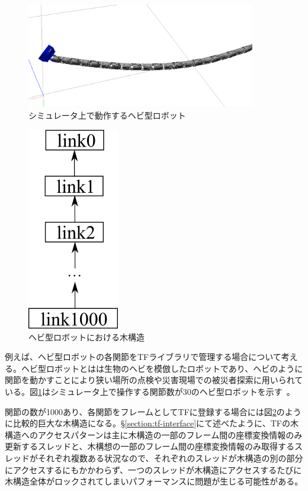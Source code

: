 \documentclass[a4paper]{jreport}	%
\begin{document}
\begin{figure}[h] 
\centering
\includegraphics[width=10cm]{snake-sim}	
\caption{シミュレータ上で動作するヘビ型ロボット}
\label{fig:snake-sim}
\end{figure}

\begin{figure}[h] 
\centering
\includegraphics[width=4cm]{snake}	
\caption{ヘビ型ロボットにおける木構造}
\label{fig:snake}
\end{figure}


例えば、ヘビ型ロボットの各関節をTFライブラリで管理する場合について考える。ヘビ型ロボットとはは生物のヘビを模倣したロボットであり、ヘビのように関節を動かすことにより狭い場所の点検や災害現場での被災者探索に用いられている。図\ref{fig:snake-sim}はシミュレータ上で操作する関節数が30のヘビ型ロボットを示す~\cite{snake-sim}。

関節の数が1000あり、各関節をフレームとしてTFに登録する場合には図\ref{fig:snake}のように比較的巨大な木構造になる。§\ref{section:tf-interface}にて述べたように、TFの木構造へのアクセスパターンは主に木構造の一部のフレーム間の座標変換情報のみ更新するスレッドと、木構想の一部のフレーム間の座標変換情報のみ取得するスレッドがそれぞれ複数ある状況なので、それぞれのスレッドが木構造の別の部分にアクセスするにもかかわらず、一つのスレッドが木構造にアクセスするたびに木構造全体がロックされてしまいパフォーマンスに問題が生じる可能性がある。
\end{document}

